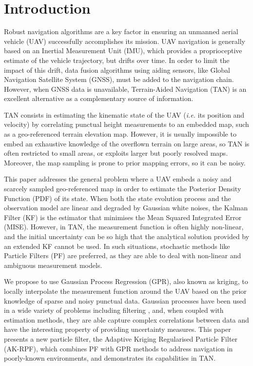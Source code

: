 \documentclass[conference]{IEEEtran}
\begin{document}
\section{Introduction}

Robust navigation algorithms are a key factor in ensuring an unmanned aerial vehicle (UAV) successfully accomplishes its mission. UAV navigation is generally based on an Inertial Measurement Unit (IMU), which provides a proprioceptive estimate of the vehicle trajectory, but drifts over time. In order to limit the impact of this drift, data fusion algorithms using aiding sensors, like Global Navigation Satellite System (GNSS), must be added to the navigation chain. However, when GNSS data is unavailable, Terrain-Aided Navigation (TAN) \cite{bib:TAN1} \cite{bib:TAN2} \cite{bib:TAN3} is an excellent alternative as a complementary source of information.

TAN consists in estimating the kinematic state of the UAV (\textit{i.e.} its position and velocity) by correlating punctual height measurements to an embedded map, such as a geo-referenced terrain elevation map. However, it is usually impossible to embed an exhaustive knowledge of the overflown terrain on large areas, so TAN is often restricted to small areas, or exploits larger but poorly resolved maps. Moreover, the map sampling is prone to prior mapping errors, so it can be noisy.

This paper addresses the general problem where a UAV embeds a noisy and scarcely sampled geo-referenced map in order to estimate the Posterior Density Function (PDF) of its state. When both the state evolution process and the observation model are linear and degraded by Gaussian white noises, the Kalman Filter (KF) is the estimator that minimises the Mean Squared Integrated Error (MISE). However, in TAN, the measurement function is often highly non-linear, and the initial uncertainty can be so high that the analytical solution provided by an extended KF cannot be used. In such situations, stochastic methods like Particle Filters (PF) are preferred, as they are able to deal with non-linear and ambiguous measurement models.

We propose to use Gaussian Process Regression (GPR), also known as kriging, to locally interpolate the measurement function around the UAV based on the prior knowledge of sparse and noisy punctual data. Gaussian processes have been used in a wide variety of problems including filtering \cite{bib:GP1} \cite{bib:GP2} \cite{bib:GP3}, and, when coupled with estimation methods, they are able capture complex correlations between data and have the interesting property of providing uncertainty measures. This paper presents a new particle filter, the Adaptive Kriging Regularised Particle Filter (AK-RPF), which combines PF with GPR methods to address navigation in poorly-known environments, and demonstrates its capabilities in TAN.
\end{document}
